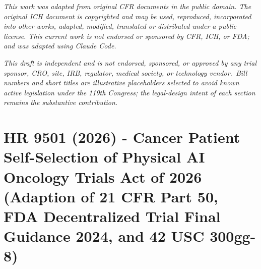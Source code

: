 \documentclass[11pt,letterpaper]{article}
\begin{document}
\vspace{0.15em}

\begin{center}
\footnotesize
\textit{This work was adapted from original CFR documents in the public
domain. The original ICH document is copyrighted and may be used,
reproduced, incorporated into other works, adapted, modified,
translated or distributed under a public license. This current work
is not endorsed or sponsored by CFR, ICH, or FDA; and was adapted
using Claude Code.}
\end{center}

\vspace{0.15em}

\begin{center}
\footnotesize
\textit{This draft is independent and is not endorsed, sponsored, or
approved by any trial sponsor, CRO, site, IRB, regulator, medical
society, or technology vendor.\ Bill numbers and short titles are
illustrative placeholders selected to avoid known active legislation
under the 119th Congress; the legal-design intent of each section
remains the substantive contribution.}
\end{center}

\vspace{0.6em}

\renewcommand{\contentsname}{\centering\large\bfseries\scshape Table of Contents}
\begingroup
\small
\setlength{\parskip}{0pt}
\tableofcontents
\endgroup

\newpage

%

\section{HR 9501 (2026) - Cancer Patient Self-Selection of Physical AI Oncology Trials Act of 2026 (Adaption of 21 CFR Part 50, FDA Decentralized Trial Final Guidance 2024, and 42 USC 300gg-8)}
\label{sec:hr9501}

\newpage
\end{document}
